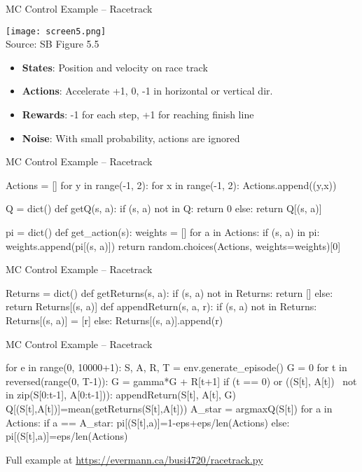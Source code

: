 \documentclass[ignorenonframetext,xcolor=x11names]{beamer}
\begin{document}
\begin{frame}[fragile]{MC Control Example -- Racetrack}
\begin{center}
\texttt{[image: screen5.png]} \\
\scriptsize Source: SB Figure 5.5 \normalsize
\end{center}
\begin{itemize}
   \item \textbf{States}: Position and velocity on race track
   \item \textbf{Actions}: Accelerate +1, 0, -1 in horizontal or vertical dir.
   \item \textbf{Rewards}: -1 for each step, +1 for reaching finish line
   \item \textbf{Noise}: With small probability, actions are ignored
\end{itemize}
\end{frame}

\begin{frame}[fragile]{MC Control Example -- Racetrack}
\begin{pythoncode}
Actions = []
for y in range(-1, 2):
    for x in range(-1, 2):
        Actions.append((y,x))

Q = dict()
def getQ(s, a):
    if (s, a) not in Q:
        return 0
    else:
        return Q[(s, a)]

pi = dict()
def get_action(s):
    weights = []
    for a in Actions:
        if (s, a) in pi:
            weights.append(pi[(s, a)])
    return random.choices(Actions, weights=weights)[0]
\end{pythoncode}
\end{frame}

\begin{frame}[fragile]{MC Control Example -- Racetrack}
\begin{pythoncode}
Returns = dict()
def getReturns(s, a):
    if (s, a) not in Returns:
        return []
    else:
        return Returns[(s, a)]
def appendReturn(s, a, r):
    if (s, a) not in Returns:
        Returns[(s, a)] = [r]
    else:
        Returns[(s, a)].append(r)
\end{pythoncode}
\end{frame}

\begin{frame}[fragile]{MC Control Example -- Racetrack}
\begin{pythoncode}
for e in range(0, 10000+1):
    S, A, R, T = env.generate_episode()
    G = 0
    for t in reversed(range(0, T-1)):
        G = gamma*G + R[t+1]
        if (t == 0) or ((S[t], A[t]) \
                not in zip(S[0:t-1], A[0:t-1])):
            appendReturn(S[t], A[t], G)
            Q[(S[t],A[t])]=mean(getReturns(S[t],A[t]))
            A_star = argmaxQ(S[t])
            for a in Actions:
                if a == A_star:
                    pi[(S[t],a)]=1-eps+eps/len(Actions)
                else:
                    pi[(S[t],a)]=eps/len(Actions)
\end{pythoncode}

Full example at \url{https://evermann.ca/busi4720/racetrack.py}
\end{frame}
\end{document}

